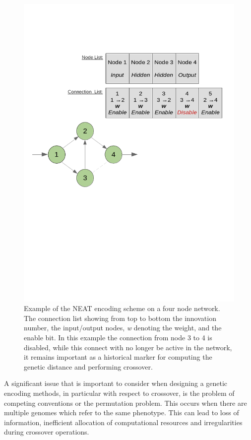 \documentclass{article}
\begin{document}
			\begin{figure}[h]
			
				\centering 
				\includegraphics[trim= 250 380 250 110 ,scale=0.35]{NEAT.png}


				\caption{Example of the NEAT encoding scheme on a four node network. The connection list showing from top to bottom the innovation number, the input/output nodes, \textit{w} denoting the weight, and the enable bit. In this example the connection from node 3 to 4 is disabled, while this connect with no longer be active in the network, it remains important as a historical marker for computing the genetic distance and performing crossover. }
				\label{fig:GA3}


			\end{figure}

		A significant issue that is important to consider when designing a genetic encoding methods, in particular with respect to crossover, is the problem of competing conventions or the permutation problem\cite{38}\cite{24}. This occurs when there are multiple genomes which refer to the same phenotype. This can lead to loss of information, inefficient allocation of computational resources and irregularities during crossover operations. 
\end{document}
